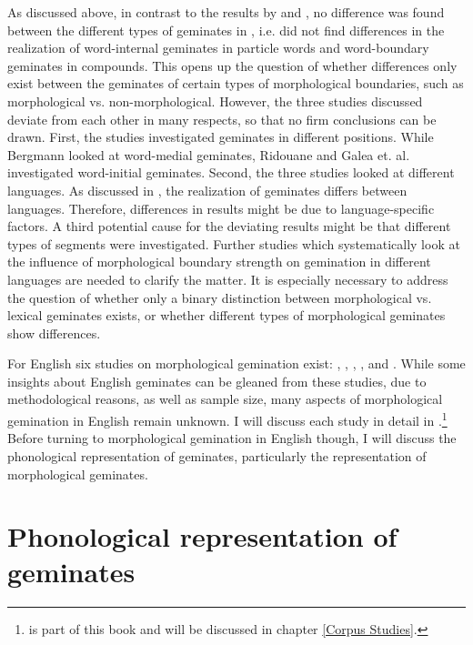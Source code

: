 As discussed above, in contrast to the results by \cite{Ridouane.2010} and \cite{Galea.2014}, no difference was found between the different types of geminates in \cite{Bergmann.2017}, i.e. \cite{Bergmann.2017} did not find differences in the realization of word-internal geminates in particle words and word-boundary geminates in compounds. This opens up the question of whether differences only exist between the geminates of certain types of morphological boundaries, such as morphological vs. non-morphological. However, the three studies discussed deviate from each other in many respects, so that no firm conclusions can be drawn. First, the studies investigated geminates in different positions. While Bergmann looked at word-medial geminates, Ridouane and Galea et. al. investigated word-initial geminates. Second, the three studies looked at different languages. As discussed in , the realization of geminates differs between languages. Therefore, differences in results might be due to language-specific factors. A third potential cause for the deviating results might be that different types of segments were investigated. Further studies which systematically look at the influence of morphological boundary strength on gemination in different languages are needed to clarify the matter. It is especially necessary to address the question of whether only a binary distinction between morphological vs. lexical geminates exists, or whether different types of morphological geminates show differences.


For English six studies on morphological gemination exist: \cite{Delattre.}, \citet{Kaye.2005}, \citet{Oh.2012}, \cite{Oh.2013}, \cite{Kotzor.2016} and \cite{BenHedia.2017}. While some insights about English geminates can be gleaned from these studies, due to methodological reasons, as well as sample size, many aspects of morphological gemination in English remain unknown. I will discuss each study in detail in .\footnote{\cite{BenHedia.2017} is part of this book and will be discussed in chapter \ref{Corpus Studies}.} Before turning to morphological gemination in English though, I will discuss the phonological representation of geminates, particularly the representation of morphological geminates.



\section{Phonological representation of geminates } \label{Phonological representation of geminates}


